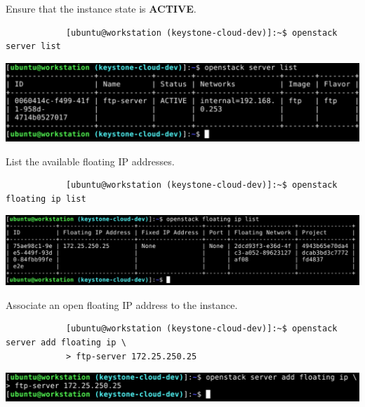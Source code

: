\documentclass[letterpaper, 12pt]{article}
\begin{document}
\begin{enumerate}
    \begin{labstep}
        Ensure that the instance state is \textbf{ACTIVE}.
        \begin{lstlisting}
            [ubuntu@workstation (keystone-cloud-dev)]:~$ openstack server list
        \end{lstlisting}

        \begin{center}
            \includegraphics[width=\linewidth]{images/part2/step2.png}
        \end{center}
    \end{labstep}

    \begin{labstep}
        List the available floating IP addresses.
        \begin{lstlisting}
            [ubuntu@workstation (keystone-cloud-dev)]:~$ openstack floating ip list
        \end{lstlisting}

        \begin{center}
            \includegraphics[width=\linewidth]{images/part2/step3.png}
        \end{center}
    \end{labstep}

    \begin{labstep}
        Associate an open floating IP address to the instance.
        \begin{lstlisting}
            [ubuntu@workstation (keystone-cloud-dev)]:~$ openstack server add floating ip \
            > ftp-server 172.25.250.25
        \end{lstlisting}

        \begin{center}
            \includegraphics[width=\linewidth]{images/part2/step4.png}
        \end{center}
    \end{labstep}


\end{enumerate}
\end{document}
